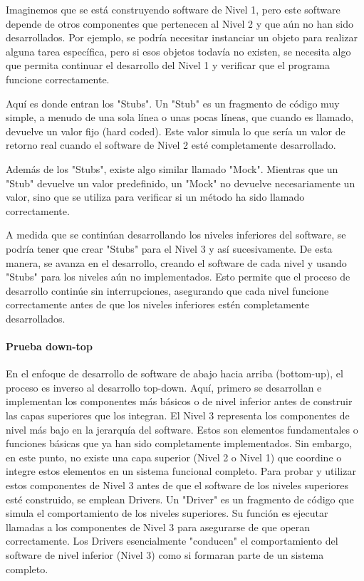 Imaginemos que se está construyendo software de Nivel 1, pero este software depende de otros componentes que pertenecen al Nivel 2 y que aún no han sido desarrollados. Por ejemplo, se podría necesitar instanciar un objeto para realizar alguna tarea específica, pero si esos objetos todavía no existen, se necesita algo que permita continuar el desarrollo del Nivel 1 y verificar que el programa funcione correctamente.

Aquí es donde entran los "Stubs". Un "Stub" es un fragmento de código muy simple, a menudo de una sola línea o unas pocas líneas, que cuando es llamado, devuelve un valor fijo (hard coded). Este valor simula lo que sería un valor de retorno real cuando el software de Nivel 2 esté completamente desarrollado.

Además de los "Stubs", existe algo similar llamado "Mock". Mientras que un "Stub" devuelve un valor predefinido, un "Mock" no devuelve necesariamente un valor, sino que se utiliza para verificar si un método ha sido llamado correctamente.

A medida que se continúan desarrollando los niveles inferiores del software, se podría tener que crear "Stubs" para el Nivel 3 y así sucesivamente. De esta manera, se avanza en el desarrollo, creando el software de cada nivel y usando "Stubs" para los niveles aún no implementados. Esto permite que el proceso de desarrollo continúe sin interrupciones, asegurando que cada nivel funcione correctamente antes de que los niveles inferiores estén completamente desarrollados.

\paragraph{Prueba down-top} En el enfoque de desarrollo de software de abajo hacia arriba (bottom-up), el proceso es inverso al desarrollo top-down. Aquí, primero se desarrollan e implementan los componentes más básicos o de nivel inferior antes de construir las capas superiores que los integran. El Nivel 3 representa los componentes de nivel más bajo en la jerarquía del software. Estos son elementos fundamentales o funciones básicas que ya han sido completamente implementados. Sin embargo, en este punto, no existe una capa superior (Nivel 2 o Nivel 1) que coordine o integre estos elementos en un sistema funcional completo. Para probar y utilizar estos componentes de Nivel 3 antes de que el software de los niveles superiores esté construido, se emplean Drivers. Un "Driver" es un fragmento de código que simula el comportamiento de los niveles superiores. Su función es ejecutar llamadas a los componentes de Nivel 3 para asegurarse de que operan correctamente. Los Drivers esencialmente "conducen" el comportamiento del software de nivel inferior (Nivel 3) como si formaran parte de un sistema completo.

